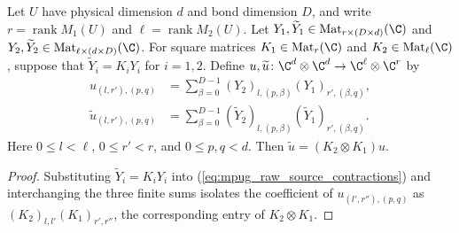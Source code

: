 \begin{lemma}
    \label{thm:mpug_source_contraction_transport}
    \leanok
    Let $U$ have physical dimension $d$ and bond dimension $D$, and write
    $r=\operatorname{rank}M_1(U)$ and $\ell=\operatorname{rank}M_2(U)$.
    Let $Y_1,\widetilde Y_1\in\operatorname{Mat}_{r\times(D\times d)}(\C)$
    and $Y_2,\widetilde Y_2\in\operatorname{Mat}_{\ell\times(d\times D)}(\C)$.
    For square matrices $K_1\in\operatorname{Mat}_r(\C)$ and
    $K_2\in\operatorname{Mat}_\ell(\C)$, suppose that
    $\widetilde Y_i=K_iY_i$ for $i=1,2$. Define
    $u,\widetilde u\colon\C^d\otimes\C^d\to\C^\ell\otimes\C^r$ by
    \begin{align}
        u_{(l,r'),(p,q)}
         & =\sum_{\beta=0}^{D-1}(Y_2)_{l,(p,\beta)}(Y_1)_{r',(\beta,q)}, \\
        \widetilde u_{(l,r'),(p,q)}
         & =\sum_{\beta=0}^{D-1}(\widetilde Y_2)_{l,(p,\beta)}
        (\widetilde Y_1)_{r',(\beta,q)}.
        \label{eq:mpug_raw_source_contractions}
    \end{align}
    Here $0\leq l<\ell$, $0\leq r'<r$, and $0\leq p,q<d$.
    Then $\widetilde u=(K_2\otimes K_1)u$.
\end{lemma}

\begin{proof}\leanok
    Substituting $\widetilde Y_i=K_iY_i$ into
    (\ref{eq:mpug_raw_source_contractions}) and interchanging the three finite
    sums isolates the coefficient of $u_{(l',r''),(p,q)}$ as
    $(K_2)_{l,l'}(K_1)_{r',r''}$, the corresponding entry of $K_2\otimes K_1$.
\end{proof}


